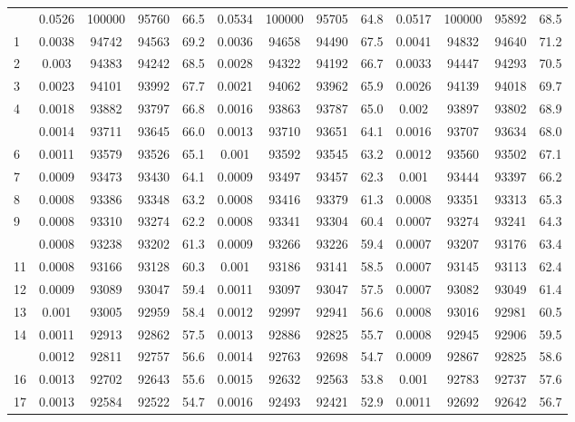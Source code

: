 \documentclass[
  14pt,
]{article}
\begin{document}
\begin{longtable}[t]{lcccccccccccc}
\endfoot
\bottomrule
\endlastfoot
0 & 0.0526 & 100000 & 95760 & 66.5 & 0.0534 & 100000 & 95705 & 64.8 & 0.0517 & 100000 & 95892 & 68.5\\
1 & 0.0038 & 94742 & 94563 & 69.2 & 0.0036 & 94658 & 94490 & 67.5 & 0.0041 & 94832 & 94640 & 71.2\\
2 & 0.003 & 94383 & 94242 & 68.5 & 0.0028 & 94322 & 94192 & 66.7 & 0.0033 & 94447 & 94293 & 70.5\\
3 & 0.0023 & 94101 & 93992 & 67.7 & 0.0021 & 94062 & 93962 & 65.9 & 0.0026 & 94139 & 94018 & 69.7\\
4 & 0.0018 & 93882 & 93797 & 66.8 & 0.0016 & 93863 & 93787 & 65.0 & 0.002 & 93897 & 93802 & 68.9\\
\addlinespace
5 & 0.0014 & 93711 & 93645 & 66.0 & 0.0013 & 93710 & 93651 & 64.1 & 0.0016 & 93707 & 93634 & 68.0\\
6 & 0.0011 & 93579 & 93526 & 65.1 & 0.001 & 93592 & 93545 & 63.2 & 0.0012 & 93560 & 93502 & 67.1\\
7 & 0.0009 & 93473 & 93430 & 64.1 & 0.0009 & 93497 & 93457 & 62.3 & 0.001 & 93444 & 93397 & 66.2\\
8 & 0.0008 & 93386 & 93348 & 63.2 & 0.0008 & 93416 & 93379 & 61.3 & 0.0008 & 93351 & 93313 & 65.3\\
9 & 0.0008 & 93310 & 93274 & 62.2 & 0.0008 & 93341 & 93304 & 60.4 & 0.0007 & 93274 & 93241 & 64.3\\
\addlinespace
10 & 0.0008 & 93238 & 93202 & 61.3 & 0.0009 & 93266 & 93226 & 59.4 & 0.0007 & 93207 & 93176 & 63.4\\
11 & 0.0008 & 93166 & 93128 & 60.3 & 0.001 & 93186 & 93141 & 58.5 & 0.0007 & 93145 & 93113 & 62.4\\
12 & 0.0009 & 93089 & 93047 & 59.4 & 0.0011 & 93097 & 93047 & 57.5 & 0.0007 & 93082 & 93049 & 61.4\\
13 & 0.001 & 93005 & 92959 & 58.4 & 0.0012 & 92997 & 92941 & 56.6 & 0.0008 & 93016 & 92981 & 60.5\\
14 & 0.0011 & 92913 & 92862 & 57.5 & 0.0013 & 92886 & 92825 & 55.7 & 0.0008 & 92945 & 92906 & 59.5\\
\addlinespace
15 & 0.0012 & 92811 & 92757 & 56.6 & 0.0014 & 92763 & 92698 & 54.7 & 0.0009 & 92867 & 92825 & 58.6\\
16 & 0.0013 & 92702 & 92643 & 55.6 & 0.0015 & 92632 & 92563 & 53.8 & 0.001 & 92783 & 92737 & 57.6\\
17 & 0.0013 & 92584 & 92522 & 54.7 & 0.0016 & 92493 & 92421 & 52.9 & 0.0011 & 92692 & 92642 & 56.7\\

\end{longtable}
\end{document}
